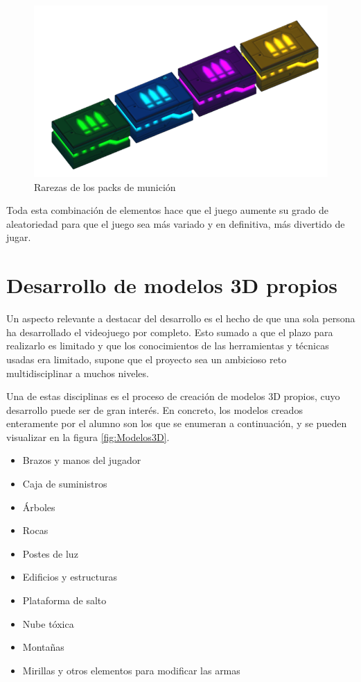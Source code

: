 \begin{figure}[h]
	\centering
	\includegraphics[scale=0.45]{img/Packs.png}
	\caption{Rarezas de los packs de munición}
	\label{fig:Packs}
    \end{figure}
Toda esta combinación de elementos hace que el juego aumente su grado de aleatoriedad para que el juego sea más variado y en definitiva, más divertido de jugar.

\section{Desarrollo de modelos 3D propios}
Un aspecto relevante a destacar del desarrollo es el hecho de que una sola persona ha desarrollado el videojuego por completo. Esto sumado a que el plazo para realizarlo es limitado y que los conocimientos de las herramientas y técnicas usadas era limitado, supone que el proyecto sea un ambicioso reto multidisciplinar a muchos niveles.

Una de estas disciplinas es el proceso de creación de modelos 3D propios, cuyo desarrollo puede ser de gran interés. En concreto, los modelos creados enteramente por el alumno son los que se enumeran a continuación, y se pueden visualizar en la figura \ref{fig:Modelos3D}.
\begin{itemize}
    \item Brazos y manos del jugador
    \item Caja de suministros
    \item Árboles
    \item Rocas
    \item Postes de luz
    \item Edificios y estructuras
    \item Plataforma de salto
    \item Nube tóxica
    \item Montañas
    \item Mirillas y otros elementos para modificar las armas
\end{itemize}


